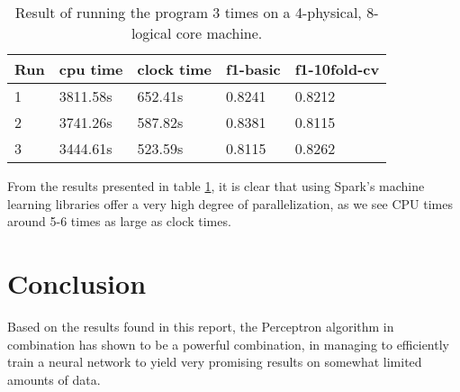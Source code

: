 \documentclass[a4paper]{article}
\begin{document}
\begin{table}[]
\centering
\begin{tabular}{|l|l|l|l|l|}
\hline
\textbf{Run} & \textbf{cpu time} & \textbf{clock time} & \textbf{f1-basic} & \textbf{f1-10fold-cv} \\ \hline
1            & 3811.58s          & 652.41s             & 0.8241            & 0.8212                \\ \hline
2            & 3741.26s          & 587.82s             & 0.8381            & 0.8115                \\ \hline
3            & 3444.61s          & 523.59s             & 0.8115            & 0.8262                \\ \hline
\end{tabular}
\caption{Result of running the program 3 times on a 4-physical, 8-logical core machine.}
\label{result_table}
\end{table}

From the results presented in table \ref{result_table}, it is clear that using Spark's machine learning libraries offer a very high degree of parallelization, as we see CPU times around 5-6 times as large as clock times.


\section{Conclusion}
Based on the results found in this report, the Perceptron algorithm in combination has shown to be a powerful combination, in managing to efficiently train a neural network to yield very promising results on somewhat limited amounts of data.
\clearpage

\end{document}

